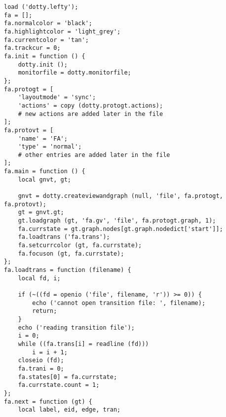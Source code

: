 \begin{verbatim}
load ('dotty.lefty');
fa = [];
fa.normalcolor = 'black';
fa.highlightcolor = 'light_grey';
fa.currentcolor = 'tan';
fa.trackcur = 0;
fa.init = function () {
    dotty.init ();
    monitorfile = dotty.monitorfile;
};
fa.protogt = [
    'layoutmode' = 'sync';
    'actions' = copy (dotty.protogt.actions);
    # new actions are added later in the file
];
fa.protovt = [
    'name' = 'FA';
    'type' = 'normal';
    # other entries are added later in the file
];
fa.main = function () {
    local gnvt, gt;

    gnvt = dotty.createviewandgraph (null, 'file', fa.protogt, fa.protovt);
    gt = gnvt.gt;
    gt.loadgraph (gt, 'fa.gv', 'file', fa.protogt.graph, 1);
    fa.currstate = gt.graph.nodes[gt.graph.nodedict['start']];
    fa.loadtrans ('fa.trans');
    fa.setcurrcolor (gt, fa.currstate);
    fa.focuson (gt, fa.currstate);
};
fa.loadtrans = function (filename) {
    local fd, i;

    if (~((fd = openio ('file', filename, 'r')) >= 0)) {
        echo ('cannot open transition file: ', filename);
        return;
    }
    echo ('reading transition file');
    i = 0;
    while ((fa.trans[i] = readline (fd)))
        i = i + 1;
    closeio (fd);
    fa.trani = 0;
    fa.states[0] = fa.currstate;
    fa.currstate.count = 1;
};
fa.next = function (gt) {
    local label, eid, edge, tran;


\end{verbatim}
